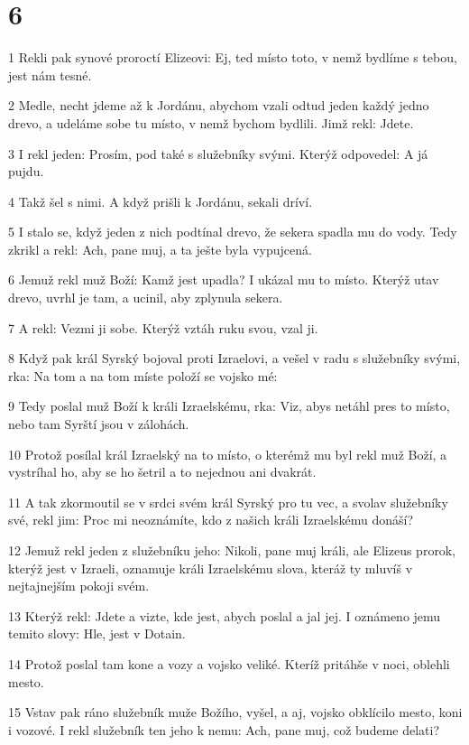 \chapter{6}

\par 1 Rekli pak synové proroctí Elizeovi: Ej, ted místo toto, v nemž bydlíme s tebou, jest nám tesné.
\par 2 Medle, necht jdeme až k Jordánu, abychom vzali odtud jeden každý jedno drevo, a udeláme sobe tu místo, v nemž bychom bydlili. Jimž rekl: Jdete.
\par 3 I rekl jeden: Prosím, pod také s služebníky svými. Kterýž odpovedel: A já pujdu.
\par 4 Takž šel s nimi. A když prišli k Jordánu, sekali dríví.
\par 5 I stalo se, když jeden z nich podtínal drevo, že sekera spadla mu do vody. Tedy zkrikl a rekl: Ach, pane muj, a ta ješte byla vypujcená.
\par 6 Jemuž rekl muž Boží: Kamž jest upadla? I ukázal mu to místo. Kterýž utav drevo, uvrhl je tam, a ucinil, aby zplynula sekera.
\par 7 A rekl: Vezmi ji sobe. Kterýž vztáh ruku svou, vzal ji.
\par 8 Když pak král Syrský bojoval proti Izraelovi, a vešel v radu s služebníky svými, rka: Na tom a na tom míste položí se vojsko mé:
\par 9 Tedy poslal muž Boží k králi Izraelskému, rka: Viz, abys netáhl pres to místo, nebo tam Syrští jsou v zálohách.
\par 10 Protož posílal král Izraelský na to místo, o kterémž mu byl rekl muž Boží, a vystríhal ho, aby se ho šetril a to nejednou ani dvakrát.
\par 11 A tak zkormoutil se v srdci svém král Syrský pro tu vec, a svolav služebníky své, rekl jim: Proc mi neoznámíte, kdo z našich králi Izraelskému donáší?
\par 12 Jemuž rekl jeden z služebníku jeho: Nikoli, pane muj králi, ale Elizeus prorok, kterýž jest v Izraeli, oznamuje králi Izraelskému slova, kteráž ty mluvíš v nejtajnejším pokoji svém.
\par 13 Kterýž rekl: Jdete a vizte, kde jest, abych poslal a jal jej. I oznámeno jemu temito slovy: Hle, jest v Dotain.
\par 14 Protož poslal tam kone a vozy a vojsko veliké. Kteríž pritáhše v noci, oblehli mesto.
\par 15 Vstav pak ráno služebník muže Božího, vyšel, a aj, vojsko obklícilo mesto, koni i vozové. I rekl služebník ten jeho k nemu: Ach, pane muj, což budeme delati?
